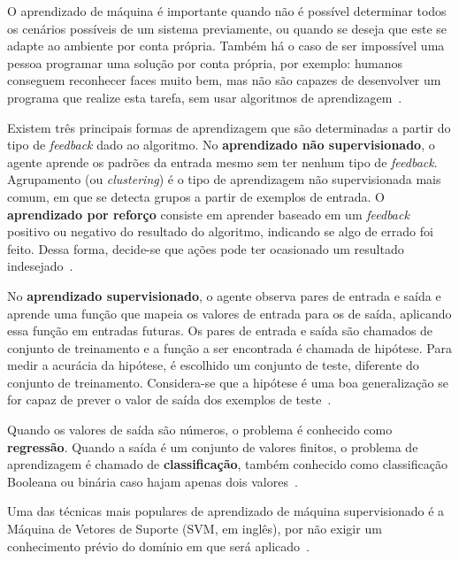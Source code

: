 O aprendizado de máquina é importante quando não é possível determinar todos os cenários possíveis de um sistema previamente, ou quando se deseja que este se adapte ao ambiente por conta própria. Também há o caso de ser impossível uma pessoa programar uma solução por conta própria, por exemplo: humanos conseguem reconhecer faces muito bem, mas não são capazes de desenvolver um programa que realize esta tarefa, sem usar algoritmos de aprendizagem~\cite{russell:2010}.

Existem três principais formas de aprendizagem que são determinadas a partir do tipo de \textit{feedback} dado ao algoritmo. No \textbf{aprendizado não supervisionado}, o agente aprende os padrões da entrada mesmo sem ter nenhum tipo de \textit{feedback}. Agrupamento (ou \textit{clustering}) é o tipo de aprendizagem não supervisionada mais comum, em que se detecta grupos a partir de exemplos de entrada. O \textbf{aprendizado por reforço} consiste em aprender baseado em um \textit{feedback} positivo ou negativo do resultado do algoritmo, indicando se algo de errado foi feito. Dessa forma, decide-se que ações pode ter ocasionado um resultado indesejado~\cite{russell:2010}.

No \textbf{aprendizado supervisionado}, o agente observa pares de entrada e saída e aprende uma função que mapeia os valores de entrada para os de saída, aplicando essa função em entradas futuras. Os pares de entrada e saída são chamados de conjunto de treinamento e a função a ser encontrada é chamada de hipótese. Para medir a acurácia da hipótese, é escolhido um conjunto de teste, diferente do conjunto de treinamento. Considera-se que a hipótese é uma boa generalização se for capaz de prever o valor de saída dos exemplos de teste~\cite{russell:2010}.

Quando os valores de saída são números, o problema é conhecido como \textbf{regressão}. Quando a saída é um conjunto de valores finitos, o problema de aprendizagem é chamado de \textbf{classificação}, também conhecido como classificação Booleana ou binária caso hajam apenas dois valores~\cite{russell:2010}.

Uma das técnicas mais populares de aprendizado de máquina supervisionado é a Máquina de Vetores de Suporte (SVM, em inglês), por não exigir um conhecimento prévio do domínio em que será aplicado~\cite{russell:2010}.

